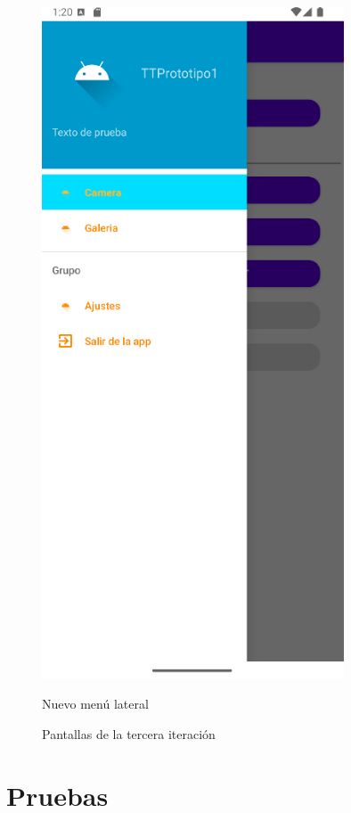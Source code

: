 \documentclass[a4paper,openright,12pt]{article}
\begin{document}
\begin{figure}[htp]
\begin{minipage}{0.3\textwidth}
        \includegraphics[width=0.8\textwidth]{Images/Vista_It3_2.png} 
        \caption{Nuevo menú lateral}
        \label{fig:figura2}
    \end{minipage}
    \caption{Pantallas de la tercera iteración}
    \label{fig:side_by_side}
\end{figure}

\section{Pruebas}
\end{document}
